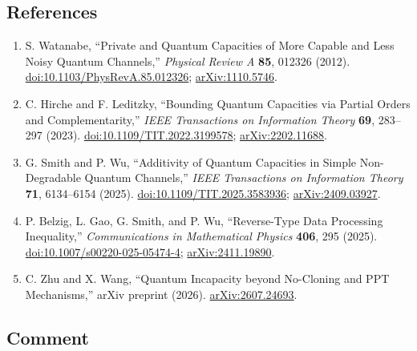 \subsection*{References}

\begin{enumerate}[label={},leftmargin=4.8em,labelsep=0.5em]
  \footnotesize
  \item[\textup{[Wat12]}]\label{ref:p52-watanabe}
  S. Watanabe, ``Private and Quantum Capacities of More Capable and Less Noisy
  Quantum Channels,'' \emph{Physical Review A} \textbf{85}, 012326 (2012).
  \href{https://doi.org/10.1103/PhysRevA.85.012326}{doi:10.1103/PhysRevA.85.012326};
  \href{https://arxiv.org/abs/1110.5746}{arXiv:1110.5746}.

  \item[\textup{[HL23]}]\label{ref:p52-hirche-leditzky}
  C. Hirche and F. Leditzky,
  ``Bounding Quantum Capacities via Partial Orders and Complementarity,''
  \emph{IEEE Transactions on Information Theory} \textbf{69}, 283--297
  (2023). \href{https://doi.org/10.1109/TIT.2022.3199578}{doi:10.1109/TIT.2022.3199578};
  \href{https://arxiv.org/abs/2202.11688}{arXiv:2202.11688}.

  \item[\textup{[SW25]}]\label{ref:p52-smith-wu}
  G. Smith and P. Wu,
  ``Additivity of Quantum Capacities in Simple Non-Degradable Quantum
  Channels,'' \emph{IEEE Transactions on Information Theory} \textbf{71},
  6134--6154 (2025).
  \href{https://doi.org/10.1109/TIT.2025.3583936}{doi:10.1109/TIT.2025.3583936};
  \href{https://arxiv.org/abs/2409.03927}{arXiv:2409.03927}.

  \item[\textup{[BGSW25]}]\label{ref:p52-belzig-et-al}
  P. Belzig, L. Gao, G. Smith, and P. Wu,
  ``Reverse-Type Data Processing Inequality,''
  \emph{Communications in Mathematical Physics} \textbf{406}, 295 (2025).
  \href{https://doi.org/10.1007/s00220-025-05474-4}{doi:10.1007/s00220-025-05474-4};
  \href{https://arxiv.org/abs/2411.19890}{arXiv:2411.19890}.

  \item[\textup{[ZW26]}]\label{ref:p52-zhu-wang}
  C. Zhu and X. Wang, ``Quantum Incapacity beyond No-Cloning and PPT
  Mechanisms,'' arXiv preprint (2026).
  \href{https://arxiv.org/abs/2607.24693}{arXiv:2607.24693}.
\end{enumerate}

\subsection*{Comment}

